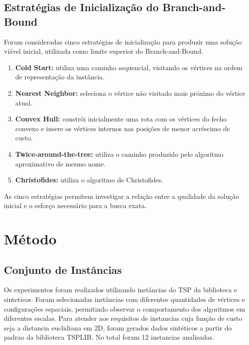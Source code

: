 \documentclass[12pt]{article}
\begin{document}
\subsection{Estratégias de Inicialização do Branch-and-Bound}

Foram consideradas cinco estratégias de inicialização para produzir uma solução viável inicial, utilizada como limite superior do Branch-and-Bound.

\begin{enumerate}
    \item \textbf{Cold Start:} utiliza uma caminho sequencial, visitando os vértices na ordem
    de representação da instância.

    \item \textbf{Nearest Neighbor:} seleciona o vértice não visitado mais próximo do vértice atual.

    \item \textbf{Convex Hull:} constrói inicialmente uma rota com os vértices do fecho convexo
    e insere os vértices internos nas posições de menor acréscimo de custo.

    \item \textbf{Twice-around-the-tree:} utiliza o caminho produzido pelo algoritmo aproximativo
    de mesmo nome.

    \item \textbf{Christofides:} utiliza o algoritmo de Christofides.
\end{enumerate}

As cinco estratégias permitem investigar a relação entre a qualidade da solução inicial e o esforço
necessário para a busca exata.


	
	\section{Método}
	\label{sec_metodo}
	
\subsection{Conjunto de Instâncias}
Os experimentos foram realizados utilizando instâncias do TSP da biblioteca e sinteticos.
Foram selecionadas instâncias com diferentes quantidades de vértices e configurações espaciais,
permitindo observar o comportamento dos algoritmos em diferentes escalas. Para atender aos requisitos de instancias cuja função de custo seja a distancia euclidiana em 2D, foram gerados dados sintéticos a partir do padrao da biblioteca TSPLIB. No total foram 12 instancias analisadas.
\end{document}
